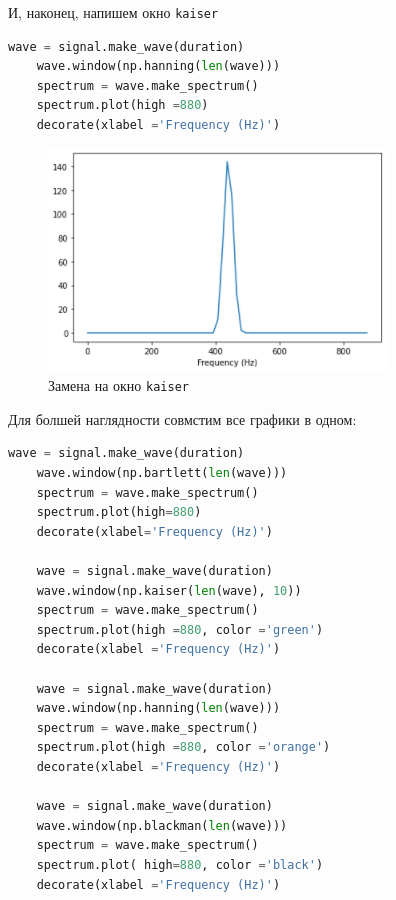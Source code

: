 \documentclass[a4paper]{article}
\begin{document}
            И, наконец, напишем окно \texttt{kaiser}
            
\begin{lstlisting}[language=Python, caption= Окно \texttt{kaiser}]
    wave = signal.make_wave(duration)
    wave.window(np.hanning(len(wave)))
    spectrum = wave.make_spectrum()
    spectrum.plot(high =880)
    decorate(xlabel ='Frequency (Hz)')
\end{lstlisting}               
            
            \begin{figure}[H]
                \centering
                \includegraphics{ex_1_kraiser.png}
                \caption{Замена на окно \texttt{kaiser}}
                \label{fig:ex_1_kraiser}
            \end{figure}
            
            Для болшей наглядности совмстим все графики в одном:
            
\begin{lstlisting}[language=Python, caption= Совмещение всех графиков]
    wave = signal.make_wave(duration)
    wave.window(np.bartlett(len(wave)))
    spectrum = wave.make_spectrum()
    spectrum.plot(high=880)
    decorate(xlabel='Frequency (Hz)')
    
    wave = signal.make_wave(duration)
    wave.window(np.kaiser(len(wave), 10))
    spectrum = wave.make_spectrum()
    spectrum.plot(high =880, color ='green')
    decorate(xlabel ='Frequency (Hz)')
    
    wave = signal.make_wave(duration)
    wave.window(np.hanning(len(wave)))
    spectrum = wave.make_spectrum()
    spectrum.plot(high =880, color ='orange')
    decorate(xlabel ='Frequency (Hz)')
    
    wave = signal.make_wave(duration)
    wave.window(np.blackman(len(wave)))
    spectrum = wave.make_spectrum()
    spectrum.plot( high=880, color ='black')
    decorate(xlabel ='Frequency (Hz)')
\end{lstlisting}               
            
\end{document}
